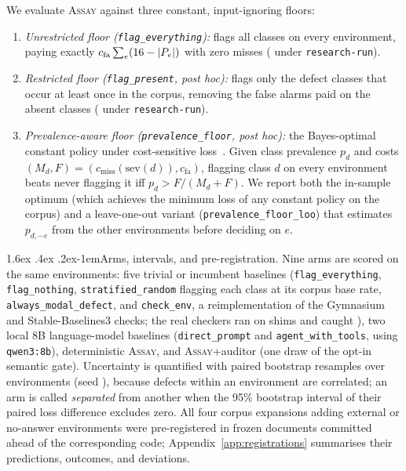 \documentclass[11pt]{article}
\makeatletter
\renewcommand\paragraph{\@startsection{paragraph}{4}{\z@}%
  {1.6ex \@plus .4ex \@minus .2ex}{-1em}{\normalfont\normalsize\bfseries}}
\newcommand{\assay}{\textsc{Assay}}
\newcommand{\fe}{\texttt{flag\_everything}}
\newcommand{\fp}{\texttt{flag\_present}}
\newcommand{\pf}{\texttt{prevalence\_floor}}
\makeatother
\begin{document}
\begin{table}[t]\centering\small

\caption{The four cost profiles (engineer-hours-equivalent). \texttt{flat} verifies that expected
loss equals raw error count; Section~\ref{sec:cost} analyses sensitivity to the CRITICAL anchor.}
\label{tab:costs}
\end{table}

We evaluate \assay{} against three constant, input-ignoring floors:
\begin{enumerate}\setlength\itemsep{1pt}\setlength\parskip{0pt}
\item \emph{Unrestricted floor (\fe{}):} flags all \nClasses{} classes on every environment, paying
exactly $c_{\text{fa}}\sum_e (16{} - |P_e|)$ with zero misses (\lossFlagEverything{} under
\texttt{research-run}).
\item \emph{Restricted floor (\fp{}, post hoc):} flags only the \nClassesPresent{} defect classes
that occur at least once in the corpus, removing the \floorAbsent{} false alarms paid on the
\nClassesAbsent{} absent classes (\floorRestricted{} under \texttt{research-run}).
\item \emph{Prevalence-aware floor (\pf{}, post hoc):} the Bayes-optimal constant policy under
cost-sensitive loss~\citep{elkan2001}. Given class prevalence $p_d$ and costs
$(M_d, F) = (c_{\text{miss}}(\mathrm{sev}(d)), c_{\text{fa}})$, flagging class $d$ on every
environment beats never flagging it iff $p_d > F / (M_d + F)$. We report both the in-sample optimum
(which achieves the minimum loss of any constant policy on the corpus) and a leave-one-out variant
(\texttt{prevalence\_floor\_loo}) that estimates $p_{d,-e}$ from the other environments before
deciding on $e$.
\end{enumerate}

\paragraph{Arms, intervals, and pre-registration.} Nine arms are scored on the same \nEnv{}
environments: five trivial or incumbent baselines (\fe{}, \texttt{flag\_nothing},
\texttt{stratified\_random} flagging each class at its corpus base rate,
\texttt{always\_modal\_defect}, and \texttt{check\_env}, a reimplementation of the Gymnasium and
Stable-Baselines3 checks; the real checkers ran on \realCheckPlanted{} shims and caught
\realCheckDetected{}), two local 8B language-model baselines (\texttt{direct\_prompt} and
\texttt{agent\_with\_tools}, using \texttt{qwen3:8b}), deterministic \assay{}, and
\assay{}+auditor (one draw of the opt-in semantic gate). Uncertainty is quantified with
\nResamples{} paired bootstrap resamples over environments (seed \bootSeed{}), because defects
within an environment are correlated; an arm is called \emph{separated} from another when the 95\%
bootstrap interval of their paired loss difference excludes zero. All four corpus expansions adding
external or no-answer environments were pre-registered in frozen documents committed ahead of the
corresponding code; Appendix~\ref{app:registrations} summarises their predictions, outcomes, and
deviations.
\end{document}
